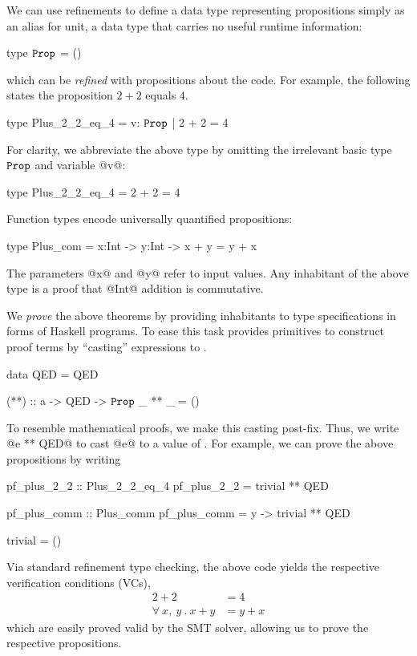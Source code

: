 %
We can use refinements to define a data type
representing propositions simply as an alias
for unit, a data type that carries no useful
runtime information:
%
\begin{mcode}
  type $\texttt{Prop}$ = ()
\end{mcode}
%
which can be \emph{refined} with
propositions about the code.
%
For example, the following states the proposition
$2 + 2$ equals $4$.
%
\begin{mcode}
  type Plus_2_2_eq_4 = { v: $\texttt{Prop}$ | 2 + 2 = 4 }
\end{mcode}
%
For clarity, we abbreviate the above type by omitting
the irrelevant basic type $\texttt{Prop}$ and variable @v@:
%
\begin{mcode}
  type Plus_2_2_eq_4 = { 2 + 2 = 4 }
\end{mcode}
%
Function types encode universally quantified propositions:
%
\begin{mcode}
  type Plus_com = x:Int -> y:Int -> { x + y = y + x }
\end{mcode}
%
The parameters @x@ and @y@ refer to input
values. Any inhabitant of the above type is a
proof that @Int@ addition is commutative.

%
We \emph{prove} the above theorems by providing inhabitants to type specifications
in forms of Haskell programs. To ease this task \toolname
provides primitives to construct proof terms by
``casting'' expressions to \typp.
%
\begin{mcode}
  data QED = QED

  (**) :: a -> QED -> $\texttt{Prop}$
  _ ** _  = ()
\end{mcode}
%
To resemble mathematical proofs, we make this casting post-fix.
Thus, we write @e ** QED@ to cast @e@ to a value of \typp.
%
For example, we can prove the above propositions by writing
%
\begin{code}
  pf_plus_2_2 :: Plus_2_2_eq_4
  pf_plus_2_2 = trivial ** QED

  pf_plus_comm :: Plus_comm
  pf_plus_comm = \x y -> trivial ** QED

  trivial = ()
\end{code}
%
Via standard refinement type checking, the above code yields
the respective verification conditions (VCs),
%
\begin{align*}
                      2 + 2 & = 4 \\
  \forall \ x,\ y\ .\ x + y & = y + x
\end{align*}
%
which are easily proved valid by the SMT solver, allowing us
to prove the respective propositions.

